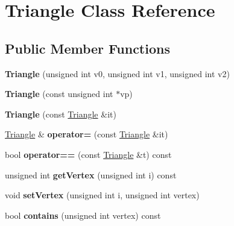 \hypertarget{class_triangle}{
\section{Triangle Class Reference}
\label{class_triangle}
}
\subsection*{Public Member Functions}
\begin{DoxyCompactItemize}
\item 
\hypertarget{class_triangle_ac855aa7c9164458725b26d358c51540a}{
{\bfseries Triangle} (unsigned int v0, unsigned int v1, unsigned int v2)}
\label{class_triangle_ac855aa7c9164458725b26d358c51540a}

\item 
\hypertarget{class_triangle_abaf08403a27a26dbc47a5d70c5bb00eb}{
{\bfseries Triangle} (const unsigned int $\ast$vp)}
\label{class_triangle_abaf08403a27a26dbc47a5d70c5bb00eb}

\item 
\hypertarget{class_triangle_a66d993754ef093c2c1319a733eee0523}{
{\bfseries Triangle} (const \hyperlink{class_triangle}{Triangle} \&it)}
\label{class_triangle_a66d993754ef093c2c1319a733eee0523}

\item 
\hypertarget{class_triangle_a0397ff9605ee5119c97d491f2c26555f}{
\hyperlink{class_triangle}{Triangle} \& {\bfseries operator=} (const \hyperlink{class_triangle}{Triangle} \&it)}
\label{class_triangle_a0397ff9605ee5119c97d491f2c26555f}

\item 
\hypertarget{class_triangle_a8a28087139b044277e66bcf61d95f067}{
bool {\bfseries operator==} (const \hyperlink{class_triangle}{Triangle} \&t) const }
\label{class_triangle_a8a28087139b044277e66bcf61d95f067}

\item 
\hypertarget{class_triangle_a82674aa7f7a2b316848f0a6743e29921}{
unsigned int {\bfseries getVertex} (unsigned int i) const }
\label{class_triangle_a82674aa7f7a2b316848f0a6743e29921}

\item 
\hypertarget{class_triangle_a5b2a044f6079b68a9d840f8ffeffd4e1}{
void {\bfseries setVertex} (unsigned int i, unsigned int vertex)}
\label{class_triangle_a5b2a044f6079b68a9d840f8ffeffd4e1}

\item 
\hypertarget{class_triangle_a04e94a20f7e63d33495d163f5a059e9b}{
bool {\bfseries contains} (unsigned int vertex) const }
\label{class_triangle_a04e94a20f7e63d33495d163f5a059e9b}

\end{DoxyCompactItemize}

